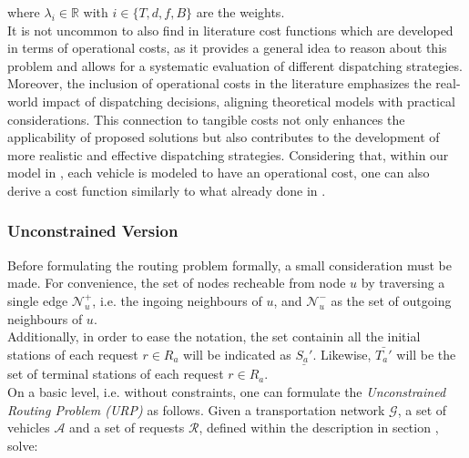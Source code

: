where $\lambda_i \in \mathbb{R}$ with $i \in \{T, d,f, B\}$ are the weights.\\
It is not uncommon to also find in literature cost functions which are developed in terms of operational costs, as it provides a general idea to reason about this problem and allows for a systematic evaluation of different dispatching strategies. Moreover, the inclusion of operational costs in the literature emphasizes the real-world impact of dispatching decisions, aligning theoretical models with practical considerations. This connection to tangible costs not only enhances the applicability of proposed solutions but also contributes to the development of more realistic and effective dispatching strategies. Considering that, within our model in , each vehicle is modeled to have an operational cost, one can also derive a cost function similarly to what already done in \cite{project_thesis}. 
\subsubsection*{Unconstrained Version}
Before formulating the routing problem formally, a small consideration must be made. For convenience, the set of nodes recheable from node $u$ by traversing a single edge $\mathcal{N}^+_u$, i.e. the ingoing neighbours of $u$, and $\mathcal{N}^-_u$ as the set of outgoing neighbours of $u$.\\ Additionally, in order to ease the notation, the set containin all the initial stations of each request $r \in R_a$ will be indicated as $\underline{S_a'}$. Likewise,  $\bar{T_a'}$ will be the set of terminal stations of each request $r \in R_a$. \\
On a basic level, i.e. without constraints, one can formulate the \textit{Unconstrained Routing Problem (URP)} as follows. Given a transportation network $\mathcal{G}$, a set of vehicles $\mathcal{A}$ and a set of requests $\mathcal{R}$, defined within the description in section , solve:


